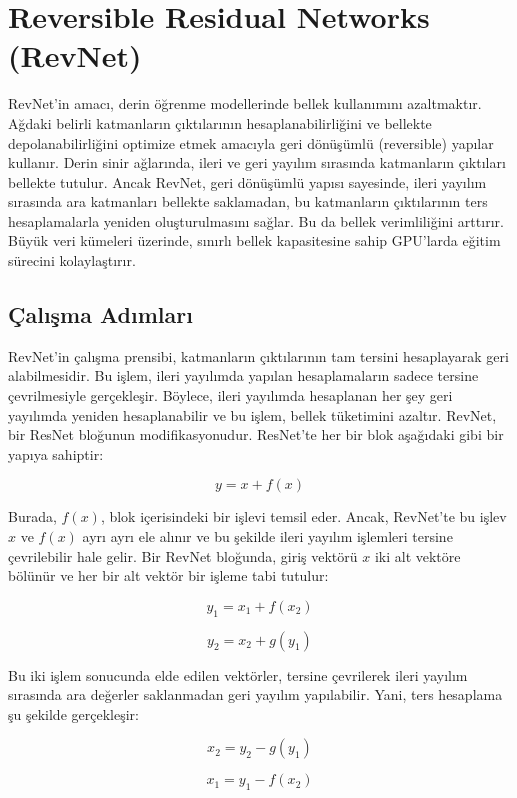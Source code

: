 \section{Reversible Residual Networks (RevNet)}

RevNet'in amacı, derin öğrenme modellerinde bellek kullanımını azaltmaktır. Ağdaki belirli katmanların çıktılarının hesaplanabilirliğini ve bellekte depolanabilirliğini optimize etmek amacıyla geri dönüşümlü (reversible) yapılar kullanır. Derin sinir ağlarında, ileri ve geri yayılım sırasında katmanların çıktıları bellekte tutulur. Ancak RevNet, geri dönüşümlü yapısı sayesinde, ileri yayılım sırasında ara katmanları bellekte saklamadan, bu katmanların çıktılarının ters hesaplamalarla yeniden oluşturulmasını sağlar. Bu da bellek verimliliğini arttırır. Büyük veri kümeleri üzerinde, sınırlı bellek kapasitesine sahip GPU'larda eğitim sürecini kolaylaştırır.

\subsection{Çalışma Adımları}

RevNet'in çalışma prensibi, katmanların çıktılarının tam tersini hesaplayarak geri alabilmesidir. Bu işlem, ileri yayılımda yapılan hesaplamaların sadece tersine çevrilmesiyle gerçekleşir. Böylece, ileri yayılımda hesaplanan her şey geri yayılımda yeniden hesaplanabilir ve bu işlem, bellek tüketimini azaltır. RevNet, bir ResNet bloğunun modifikasyonudur. ResNet'te her bir blok aşağıdaki gibi bir yapıya sahiptir:

\[ y = x + f(x) \]

Burada, $f(x)$, blok içerisindeki bir işlevi temsil eder. Ancak, RevNet'te bu işlev $x$ ve $f(x)$ ayrı ayrı ele alınır ve bu şekilde ileri yayılım işlemleri tersine çevrilebilir hale gelir. Bir RevNet bloğunda, giriş vektörü $x$ iki alt vektöre bölünür ve her bir alt vektör bir işleme tabi tutulur:

\[ y_1 = x_1 + f(x_2) \]

\[ y_2 = x_2 + g(y_1)\]

Bu iki işlem sonucunda elde edilen vektörler, tersine çevrilerek ileri yayılım sırasında ara değerler saklanmadan geri yayılım yapılabilir. Yani, ters hesaplama şu şekilde gerçekleşir:

\[ x_2 = y_2 - g(y_1) \]

\[ x_1 = y_1 - f(x_2) \]

\newpage